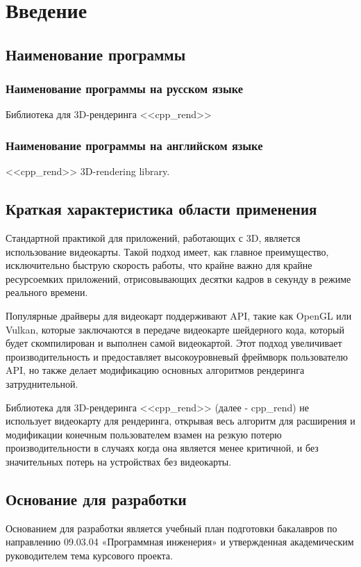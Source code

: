 \section{Введение}

\subsection{Наименование программы}

\subsubsection{Наименование программы на русском языке}

Библиотека для 3D-рендеринга <<cpp\_rend>>

\subsubsection{Наименование программы на английском языке}

<<cpp\_rend>> 3D-rendering library.

\subsection{Краткая характеристика области применения}

Стандартной практикой для приложений, работающих с 3D, является использование видеокарты. Такой подход имеет, как главное преимущество, исключительно быструю скорость работы, что крайне важно для крайне ресурсоемких приложений, отрисовывающих десятки кадров в секунду в режиме реального времени.

Популярные драйверы для видеокарт поддерживают API, такие как OpenGL или Vulkan, которые заключаются в передаче видеокарте шейдерного кода, который будет скомпилирован и выполнен самой видеокартой. Этот подход увеличивает производительность и предоставляет высокоуровневый фреймворк пользователю API, но также делает модификацию основных алгоритмов рендеринга затруднительной.

Библиотека для 3D-рендеринга <<cpp\_rend>> (далее - cpp\_rend) не использует видеокарту для рендеринга, открывая весь алгоритм для расширения и модификации конечным пользователем взамен на резкую потерю производительности в случаях когда она является менее критичной, и без значительных потерь на устройствах без видеокарты.

\subsection{Основание для разработки}

Основанием для разработки является учебный план подготовки бакалавров по направлению 09.03.04 «Программная инженерия» и утвержденная академическим руководителем тема курсового проекта.
